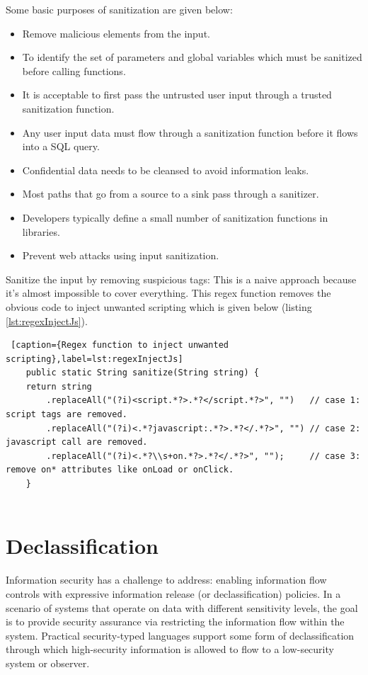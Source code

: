 Some basic purposes of sanitization are given below:
\begin{itemize}
	\item Remove malicious elements from the input.
	\item To identify the set of parameters and global variables which must be sanitized before calling functions.
	\item It is acceptable to first pass the untrusted user input through a trusted sanitization function.	
	\item Any user input data must flow through a sanitization function before it flows into a SQL query.
	\item Confidential data needs to be cleansed to avoid information leaks.
	\item Most paths that go from a source to a sink pass through a sanitizer.
	\item Developers typically define a small number of sanitization functions in libraries.
	\item Prevent web attacks using input sanitization.
\end{itemize}

Sanitize the input by removing suspicious tags:
This is a naive approach because it's almost impossible to cover everything. This regex function removes the obvious code to inject unwanted scripting which is given below (listing \ref{lst:regexInjectJs}).

\begin{lstlisting} [caption={Regex function to inject unwanted scripting},label=lst:regexInjectJs]
	public static String sanitize(String string) {
	return string
		.replaceAll("(?i)<script.*?>.*?</script.*?>", "")   // case 1: script tags are removed.
		.replaceAll("(?i)<.*?javascript:.*?>.*?</.*?>", "") // case 2: javascript call are removed.
		.replaceAll("(?i)<.*?\\s+on.*?>.*?</.*?>", "");     // case 3: remove on* attributes like onLoad or onClick.
	}
	
\end{lstlisting}


\section{Declassification}
Information security has a challenge to address: enabling information flow controls with expressive information release (or declassification) policies. In a scenario of systems that operate on data with different sensitivity levels, the goal is to provide security assurance via restricting the information flow within the system. Practical security-typed languages support some form of declassification through which high-security information is allowed to flow to a low-security system or observer.

